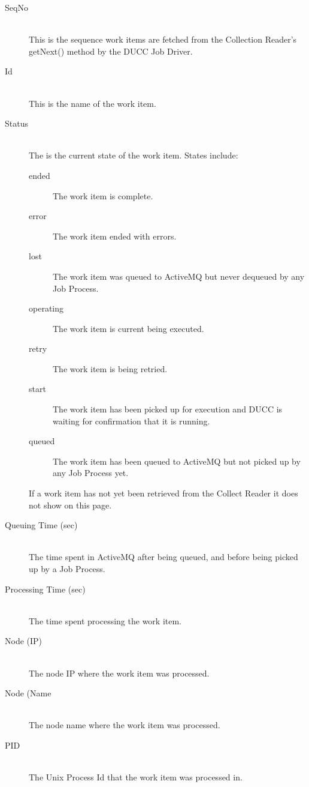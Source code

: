    \begin{description}
     \item[SeqNo]  \hfill \\
       This is the sequence work items are fetched from the Collection Reader's
       getNext() method by the DUCC Job Driver.
     \item[Id]  \hfill \\
       This is the name of the work item.
     \item[Status]  \hfill \\
       The is the current state of the work item.  
       States include:
       \begin{description}
         \item[ended] The work item is complete.
         \item[error] The work item ended with errors.
         \item[lost] The work item was queued to ActiveMQ but never dequeued by
         any Job Process.
         \item[operating] The work item is current being executed.
         \item[retry] The work item is being retried.
         \item[start] The work item has been picked up for execution and DUCC is waiting
           for confirmation that it is running.
         \item[queued] The work item has been queued to ActiveMQ but not picked up by any
           Job Process yet.
       \end{description}
       If a work item has not yet been retrieved from the Collect Reader it does not show
       on this page.
     \item[Queuing Time (sec)]  \hfill \\
       The time spent in ActiveMQ after being queued, and before
       being picked up by a Job Process.
     \item[Processing Time (sec)]  \hfill \\
       The time spent processing the work item.
     \item[Node (IP)]  \hfill \\
       The node IP where the work item was processed.
     \item[Node (Name]  \hfill \\
       The node name where the work item was processed.
     \item[PID]  \hfill \\
       The Unix Process Id that the work item was processed in.
   \end{description}
   

